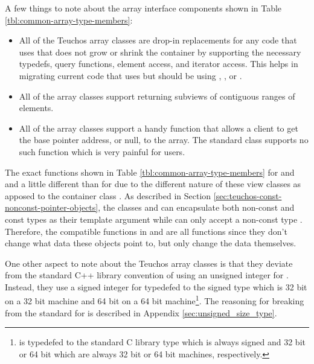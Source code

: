 \documentclass[pdf,ps2pdf,11pt]{SANDreport}
\begin{document}
A few things to note about the array interface components shown in
Table {}\ref{tbl:common-array-type-members}:

\begin{itemize}

{}\item{}All of the Teuchos array classes are drop-in replacements for
any code that uses {} that does not grow or shrink
the container by supporting the necessary typedefs, query functions,
element access, and iterator access.  This helps in migrating current
code that uses {} but should be using
{}, {}, {} or
{}.

{}\item{}All of the array classes support returning 
subviews of contiguous ranges of elements.

{}\item{}All of the array classes support a handy
{} function that allows a client to get the base
pointer address, or null, to the array.  The standard
{} class supports no such function which is very
painful for users.

\end{itemize}

The exact functions shown in Table
{}\ref{tbl:common-array-type-members} for {} and
{} and a little different than for {}
due to the different nature of these view classes as apposed to the
container class {}.  As described in Section
{}\ref{sec:teuchos-const-nonconst-pointer-objects}, the classes
{} and {} can encapsulate both
non-const and const types {} as their template argument
while {} can only accept a non-const type {}.
Therefore, the {} compatible functions in
{} and {} are all {}
functions since they don't change what data these objects point to,
but only change the data themselves.

One other aspect to note about the Teuchos array classes is that they
deviate from the standard C++ library convention of using an unsigned
integer for {}.  Instead, they use a signed integer
for {} typedefed to the signed type
{} which is 32 bit on a 32 bit machine and 64
bit on a 64 bit machine\footnote{{} is
typedefed to the standard C library type {} which
is always signed and 32 bit or 64 bit which are always 32 bit or 64
bit machines, respectively.}.  The reasoning for breaking from the
{} standard for {} is described
in Appendix {}\ref{sec:unsigned_size_type}.
\end{document}
